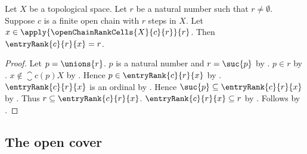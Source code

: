 \begin{proposition}\label{open_chain_entry_rank_on_last_cell}
    Let $X$ be a topological space.
    Let $r$ be a natural number such that $r\neq\emptyset$.
    Suppose $c$ is a finite open chain with $r$ steps in $X$.
    Let $x\in\apply{\openChainRankCells{X}{c}{r}}{r}$.
    Then $\entryRank{c}{r}{x}=r$.
\end{proposition}
\begin{proof}
    Let $p=\unions{r}$.
    $p$ is a natural number and $r=\suc{p}$
        by .
    $p\in r$ by .
    $x\notin\closure{c(p)}{X}$
        by .
    Hence $p\in\entryRank{c}{r}{x}$
        by .
    $\entryRank{c}{r}{x}$ is an ordinal
        by .
    Hence $\suc{p}\subseteq\entryRank{c}{r}{x}$
        by .
    Thus $r\subseteq\entryRank{c}{r}{x}$.
    $\entryRank{c}{r}{x}\subseteq r$
        by .
    Follows by .
\end{proof}

\subsection{The open cover}

